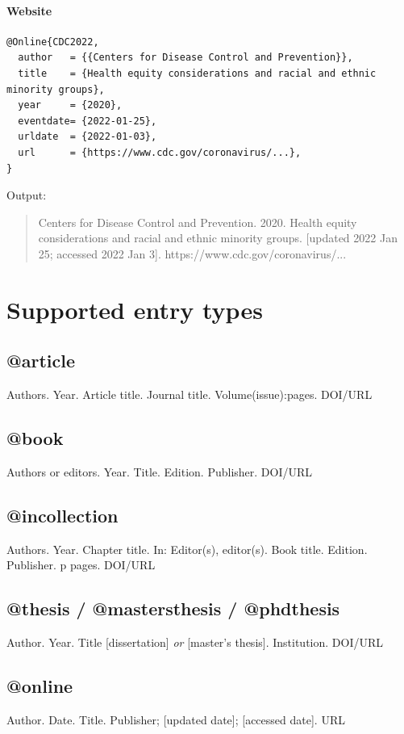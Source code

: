 \documentclass[11pt]{article}
\begin{document}
\paragraph{Website}
\begin{verbatim}
@Online{CDC2022,
  author   = {{Centers for Disease Control and Prevention}},
  title    = {Health equity considerations and racial and ethnic minority groups},
  year     = {2020},
  eventdate= {2022-01-25},
  urldate  = {2022-01-03},
  url      = {https://www.cdc.gov/coronavirus/...},
}
\end{verbatim}

Output:
\begin{quote}
Centers for Disease Control and Prevention. 2020. Health equity considerations and racial and ethnic minority groups. [updated 2022 Jan 25; accessed 2022 Jan 3]. https://www.cdc.gov/coronavirus/...
\end{quote}

\section{Supported entry types}

\subsection{@article}
Authors. Year. Article title. Journal title. Volume(issue):pages. DOI/URL

\subsection{@book}
Authors or editors. Year. Title. Edition. Publisher. DOI/URL

\subsection{@incollection}
Authors. Year. Chapter title. In: Editor(s), editor(s). Book title. Edition. Publisher. p pages. DOI/URL

\subsection{@thesis / @mastersthesis / @phdthesis}
Author. Year. Title [dissertation] \emph{or} [master's thesis]. Institution. DOI/URL

\subsection{@online}
Author. Date. Title. Publisher; [updated date]; [accessed date]. URL
\end{document}
